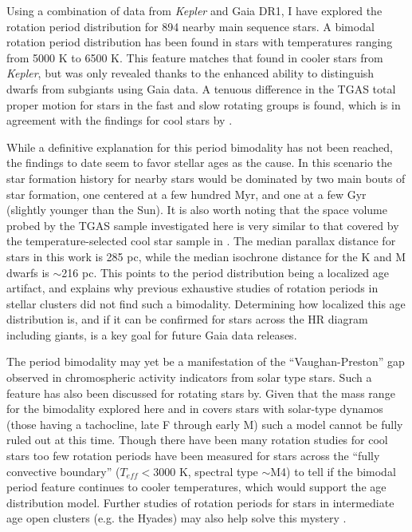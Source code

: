 \documentclass[manuscript, letterpaper]{aastex6}
\newcommand{\Kepler}{\textsl{Kepler}\xspace}
\begin{document}
Using a combination of data from \Kepler and Gaia DR1, I have explored the rotation period distribution for 894 nearby main sequence stars. A bimodal rotation period distribution has been found in stars with temperatures ranging from 5000 K to 6500 K. This feature matches that found in cooler stars from \Kepler, but was only revealed thanks to the enhanced ability to distinguish dwarfs from subgiants using Gaia data. 
A tenuous difference in the TGAS total proper motion for stars in the fast and slow rotating groups is found, which is in agreement with the findings for cool stars by \citet{mcquillan2013}.

While a definitive explanation for this period bimodality has not been reached, the findings to date seem to favor stellar ages as the cause. In this scenario the star formation history for nearby stars would be dominated by two main bouts of star formation, one centered at a few hundred Myr, and one at a few Gyr (slightly younger than the Sun). It is also worth noting that the space volume probed by the TGAS sample investigated here is very similar to that covered by the temperature-selected cool star sample in \citet{mcquillan2013}. The median parallax distance for stars in this work is 285 pc, while the median isochrone distance for the K and M dwarfs is $\sim$216 pc. This points to the period distribution being a localized age artifact, and explains why previous exhaustive studies of rotation periods in stellar clusters did not find such a bimodality. Determining how localized this age distribution is, and if it can be confirmed for stars across the HR diagram including giants, is a key goal for future Gaia data releases.


The period bimodality may yet be a manifestation of the ``Vaughan-Preston'' gap observed in chromospheric activity indicators from solar type stars. Such a feature has also been discussed for rotating stars by\citet{kado-fong2016}. Given that the mass range for the bimodality explored here and in \citet{mcquillan2014} covers stars with solar-type dynamos (those having a tachocline, late F through early M) such a model cannot be fully ruled out at this time. Though there have been many rotation studies for cool stars \citep[e.g.][]{irwin2011,newton2016,stelzer2016} too few rotation periods have been measured for stars across the ``fully convective boundary'' ($T_{eff}<3000$ K, spectral type $\sim$M4) to tell if the bimodal period feature continues to cooler temperatures, which would support the age distribution model. Further studies of rotation periods for stars in intermediate age open clusters (e.g. the Hyades) may also help solve this mystery \citep[e.g.][]{douglas2014}.
\end{document}

